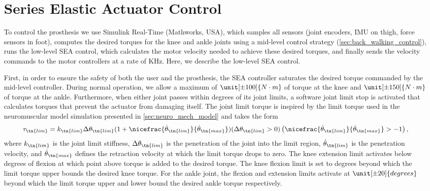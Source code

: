 \section{Series Elastic Actuator Control}\label{sec:sea_control}

To control the prosthesis we use Simulink Real-Time (Mathworks, USA), which
samples all sensors (joint encoders, IMU on thigh, force sensors in foot),
computes the desired torques for the knee and ankle joints using a mid-level
control strategy (\cref{sec:back_walking_control}), runs the low-level SEA
control, which calculates the motor velocity needed to achieve these desired
torques, and finally sends the velocity commands to the motor controllers at a
rate of \unit[1]{KHz}. Here, we describe the low-level SEA control.

First, in order to ensure the safety of both the user and the prosthesis, the SEA
controller saturates the desired torque commanded by the mid-level
controller. During normal operation, we allow a maximum of $\unit[\pm 100]{N
\cdot m}$ of torque at the knee and $\unit[\pm 150]{N \cdot m}$ of torque at the
ankle. Furthermore, when either joint passes within \unit[5]{degrees} of its joint
limits, a software joint limit stop is activated that calculates torques that
prevent the actuator from damaging itself. The joint limit torque is inspired by
the limit torque used in the neuromuscular model simulation presented in
\cref{sec:neuro_mech_model} and takes the form
\begin{align}
    \tau_\tn{lim} = k_\tn{lim} \Delta \theta_\tn{lim} 
    (1 + \nicefrac{\dot \theta_\tn{lim}}{\dot \theta_\tn{max}}) 
    (\Delta \theta_\tn{lim}  > 0) 
    \left(\nicefrac{\dot \theta_\tn{lim}}{\dot \theta_\tn{max}} > -1 \right), 
    \label{eq:tau_joint_limit_pros}
\end{align}
where $k_\tn{lim}$ is the joint limit stiffness, $\Delta \theta_\tn{lim}$ is the
penetration of the joint into the limit region, $\dot \theta_\tn{lim}$ is the
penetration velocity, and $\dot \theta_\tn{max}$ defines the retraction
velocity at which the limit torque drops to zero. The knee extension limit
activates below \unit[5]{degrees} of flexion at which point above torque is
added to the desired torque. The knee flexion limit is set to
\unit[90]{degrees} beyond which the limit torque upper bounds the desired knee
torque. For the ankle joint, the flexion and extension limits activate at
$\unit[\pm 20]{degrees}$ beyond which the limit torque upper and lower bound the
desired ankle torque respectively.

